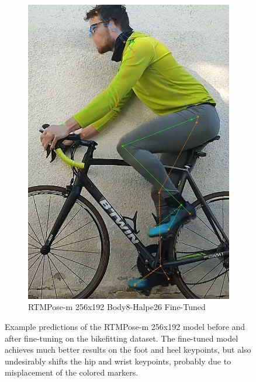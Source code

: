 \begin{figure}[htbp]
\begin{subfigure}[t]{\imgwidth}
    \end{subfigure}
    \hfill
    \begin{subfigure}[t]{\imgwidth}
        \centering

        \includegraphics[width=\smallimgwidth]{obrazky-figures/rtmpose-m-256x192_trainedzlute_196_crop.jpg}
        \caption{RTMPose-m 256x192 Body8-Halpe26 Fine-Tuned}
    \end{subfigure}
    \caption{
        Example predictions of the RTMPose-m 256x192 model before and after fine-tuning on the bikefitting dataset. The fine-tuned model achieves much better results on the foot and heel keypoints, but also undesirably shifts the hip and wrist keypoints, probably due to misplacement of the colored markers.}
    \label{fig:trained_examples}
\end{figure}


